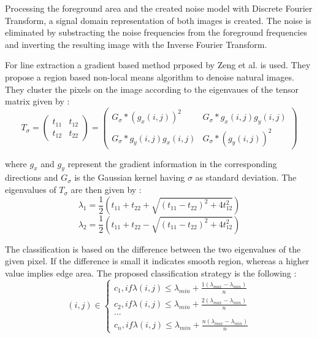 \documentclass[draft,final]{vutinfth} %
\begin{document}
Processing the foreground area and the created noise model with Discrete Fourier Transform, a signal domain representation  of both images is created.
The noise is eliminated by substracting the noise frequencies from the foreground frequencies and inverting the resulting image with the Inverse Fourier Transform.
\par
For line extraction a gradient based method prposed by Zeng et al. \cite{zeng2011region} is used.
They propose a region based non-local means algorithm to denoise natural images.
They cluster the pixels on the image according to the eigenvaues of the tensor matrix given by \cite{zeng2011region}:
\[T_\sigma = 
\begin{pmatrix}
t_{11} & t_{12} \\
t_{12} & t_{22}
\end{pmatrix}
=
\begin{pmatrix}
G_\sigma*(g_x(i,j))^2 & G_{\sigma}*g_x(i, j)g_y(i, j)\\
G_{\sigma}*g_y(i, j)g_x(i, j) & G_{\sigma}*(g_y(i, j))^2
\end{pmatrix}
\]

where $g_x$ and $g_y$ represent the gradient information in the corresponding directions and $G_\sigma$ is the Gaussian kernel having $\sigma$ as standard deviation.
The eigenvalues of $T_\sigma$ are then given by \cite{zeng2011region}:
\[\lambda_1 = \frac{1}{2}(t_{11} + t_{22} + \sqrt{(t_{11}-t_{22})^2 + 4t_{12}^2})\]  
\[\lambda_2 = \frac{1}{2}(t_{11} + t_{22} - \sqrt{(t_{11}-t_{22})^2 + 4t_{12}^2})\]  

The classification is based on the difference between the two eigenvalues of the given pixel.
If the difference is small it indicates smooth region, whereas a higher value implies edge area.
The proposed classification strategy is the following \cite{zeng2011region}:
\[
(i, j)\in \left\{
                \begin{array}{ll}
                  c_1, if \lambda(i,j) \leq \lambda_{min} + \frac{1(\lambda_{max} - \lambda_{min})}{n}\\
                  c_2, if \lambda(i,j) \leq \lambda_{min} + \frac{2(\lambda_{max} - \lambda_{min})}{n}\\
				... \\
                   c_n, if \lambda(i,j) \leq \lambda_{min} + \frac{n(\lambda_{max} - \lambda_{min})}{n}
                \end{array}
              \right.
\]
\end{document}

